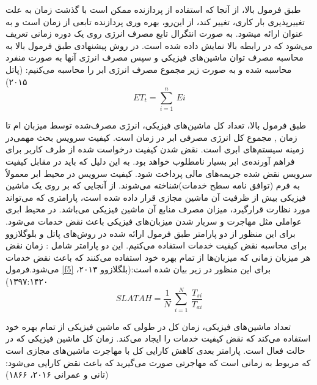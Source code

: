 طبق فرمول بالا، از آنجا  که استفاده از پردازنده ممکن است با گذشت زمان به علت تغییرپذیری بار کاری­، تغییر کند­، از این‌رو، بهره وری پردازنده تابعی از زمان است و به عنوان 
ارائه می­شود­.
 به صورت انتگرال تابع مصرف انرژی روی یک دوره زمانی تعریف می‌شود که در رابطه بالا نمایش داده شده است. در روش پیشنهادی طبق فرمول بالا به محاسبه مصرف توان ماشین‌های فیزیکی و سپس مصرف انرژی آنها به صورت منفرد محاسبه شده و به صورت زیر مجموع مصرف انرژی ابر را محاسبه می‌کنیم: (پاتل ۲۰۱۵)
\begin{equation}
ET_t = \sum_{i=1}^{n}\:Ei
\label{f4}
\end{equation}

طبق فرمول بالا،
 تعداد کل ماشین‌های فیزیکی­،
  انرژی مصرف‌شده توسط میزبان 
   ام تا زمان
   ,
  مجموع کل انرژی مصرفی ابر در زمان
   است­.
   کیفیت سرویس بحث مهمی‌در زمینه سیستم‌های ابری است. نقض شدن کیفیت درخواست شده از طرف کاربر برای فراهم آورنده‌ی ابر بسیار نامطلوب خواهد بود. به این دلیل که باید در مقابل کیفیت سرویس نقض شده جریمه‌های مالی پرداخت شود. کیفیت سرویس در محیط ابر معمولاً به فرم
   (توافق نامه سطح خدمات)شناخته می‌شوند. از آنجایی که بر روی یک ماشین فیزیکی بیش از ظرفیت آن ماشین مجازی قرار داده‌ شده ‌است، پارامتری که می‌تواند مورد نظارت قرار‌گیرد، میزان مصرف منابع آن ماشین فیزیکی می‌باشد. 
   در محیط ابری عواملی مثل مهاجرت و سربار شدن میزبان‌های فیزیکی باعث نقض خدمات می‌شود. برای این منظور از دو پارامتر طبق فرمول ارائه شده در روش‌های پاتل و بلوگلازوو 
   برای محاسبه نقض کیفیت خدمات استفاده می‌کنیم. این دو پارامتر شامل :
   زمان نقض
   هر میزبان
   زمانی که میزبان‌ها از تمام بهره خود استفاده می‌کنند که باعث نقض خدمات می‌شود.فرمول
\ref{f5}
    برای این منظور در زیر بیان شده است:(بلگلازوو  ۲۰۱۳، ۱۳۹۷:۱۴۲۰)
\begin{equation}
SLATAH=\frac{1}{N}\:\sum_{i=1}^{N}\:\frac{T_{si}}{T_{ai}}
\label{f5}
\end{equation}
   
   تعداد ماشین‌های فیزیکی،
      زمان کل در طولی که ماشین فیزیکی 
    از تمام بهره خود استفاده می‌کند که نقض کیفیت خدمات را ایجاد می‌کند. 
      زمان کل ماشین فیزیکی 
    که در حالت فعال است. 
   پارامتر بعدی کاهش کارایی کل با مهاجرت ماشین‌های مجازی
   است که مربوط به زمانی است که مهاجرتی صورت می‌گیرید که باعث نقض کارایی می‌شود: 
(تانی و عمرانی
 ۲۰۱۶، ۱۸۶۶)

